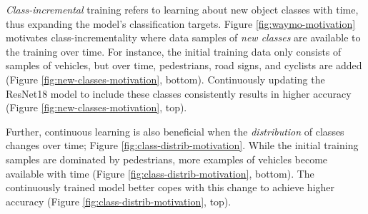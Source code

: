 {\em Class-incremental} training refers to learning about new object classes with time, thus expanding the model's classification targets. Figure \ref{fig:waymo-motivation} motivates class-incrementality where data samples of {\em new classes} are available to the training over time. For instance, the initial training data only consists of samples of vehicles, but over time, pedestrians, road signs, and cyclists are added (Figure \ref{fig:new-classes-motivation}, bottom). Continuously updating the ResNet18 model to include these classes consistently results in higher accuracy (Figure \ref{fig:new-classes-motivation}, top). 

Further, continuous learning is also beneficial when the {\em distribution} of classes changes over time; Figure \ref{fig:class-distrib-motivation}. While the initial training samples are dominated by pedestrians, more examples of vehicles become available with time (Figure \ref{fig:class-distrib-motivation}, bottom). The continuously trained model better copes with this change to achieve higher accuracy (Figure \ref{fig:class-distrib-motivation}, top). 




